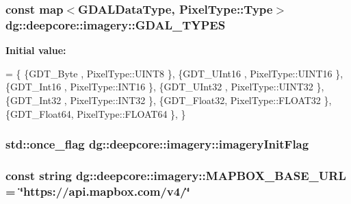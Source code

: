 \subsubsection[{\texorpdfstring{G\+D\+A\+L\+\_\+\+T\+Y\+P\+ES}{GDAL_TYPES}}]{\setlength{\rightskip}{0pt plus 5cm}const map$<$G\+D\+A\+L\+Data\+Type, {\bf Pixel\+Type\+::\+Type}$>$ dg\+::deepcore\+::imagery\+::\+G\+D\+A\+L\+\_\+\+T\+Y\+P\+ES\hspace{0.3cm}{\ttfamily [static]}}\hypertarget{namespacedg_1_1deepcore_1_1imagery_a3789b9a347ec09b23d7d45351cc87707}{}\label{namespacedg_1_1deepcore_1_1imagery_a3789b9a347ec09b23d7d45351cc87707}
{\bfseries Initial value\+:}
\begin{DoxyCode}
= \{
    \{GDT\_Byte   , PixelType::UINT8 \},
    \{GDT\_UInt16 , PixelType::UINT16 \},
    \{GDT\_Int16  , PixelType::INT16 \},
    \{GDT\_UInt32 , PixelType::UINT32 \},
    \{GDT\_Int32  , PixelType::INT32 \},
    \{GDT\_Float32, PixelType::FLOAT32 \},
    \{GDT\_Float64, PixelType::FLOAT64 \},
\}
\end{DoxyCode}
\subsubsection[{\texorpdfstring{imagery\+Init\+Flag}{imageryInitFlag}}]{\setlength{\rightskip}{0pt plus 5cm}std\+::once\+\_\+flag dg\+::deepcore\+::imagery\+::imagery\+Init\+Flag}\hypertarget{namespacedg_1_1deepcore_1_1imagery_a5bd34f6242dc2b966d56787202281cd3}{}\label{namespacedg_1_1deepcore_1_1imagery_a5bd34f6242dc2b966d56787202281cd3}
\subsubsection[{\texorpdfstring{M\+A\+P\+B\+O\+X\+\_\+\+B\+A\+S\+E\+\_\+\+U\+RL}{MAPBOX_BASE_URL}}]{\setlength{\rightskip}{0pt plus 5cm}const string dg\+::deepcore\+::imagery\+::\+M\+A\+P\+B\+O\+X\+\_\+\+B\+A\+S\+E\+\_\+\+U\+RL = \char`\"{}https\+://api.\+mapbox.\+com/v4/\char`\"{}}\hypertarget{namespacedg_1_1deepcore_1_1imagery_a977bcd35334fda555ec11800e73afacd}{}\label{namespacedg_1_1deepcore_1_1imagery_a977bcd35334fda555ec11800e73afacd}
